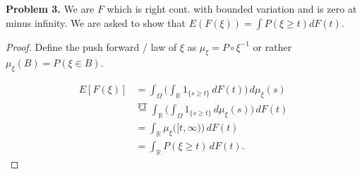 \documentclass[11pt]{article}
\begin{document}
\textbf{Problem 3.}
\newline
We are $F$ which is right cont. with bounded variation and is zero at minus infinity. We are asked to show that $E(F(\xi)) = \int P(\xi \geq t) dF(t)$. 
\begin{proof}
Define the push forward / law of $\xi$ as $\mu_\xi = P \circ \xi^{-1}$ or rather $\mu_\xi(B) = P(\xi \in B)$.

\begin{align}
	E[F(\xi)] &= \int_\Omega \biggl(\int_{\mathbb{R}} 1_{\{s\ge t\}} \,dF(t)\biggr)\,d\mu_\xi(s) \\
	&\overset{\text{FT}}{=} \int_{\mathbb{R}} \biggl(\int_\Omega 1_{\{s\ge t\}} \,d\mu_\xi(s)\biggr)\,dF(t) \\
	&= \int_{\mathbb{R}} \mu_\xi\bigl([t,\infty)\bigr)\,dF(t) \\
	&= \int_{\mathbb{R}} P(\xi \ge t)\,dF(t).
\end{align}
\end{proof}
\end{document}

